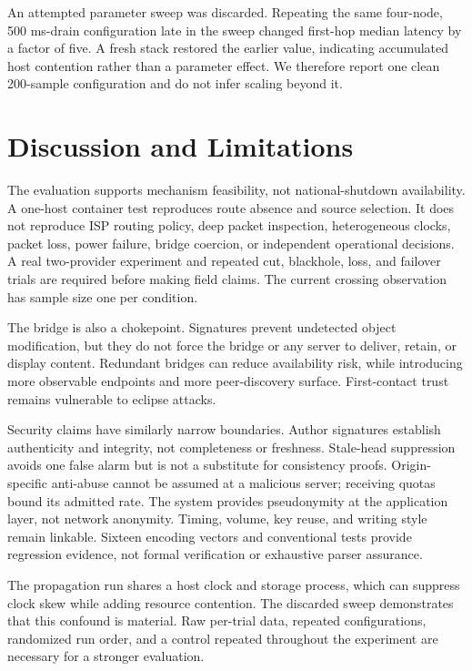 \documentclass[conference,a4paper]{IEEEtran}
\begin{document}
An attempted parameter sweep was discarded. Repeating the same four-node, 500 ms-drain configuration
late in the sweep changed first-hop median latency by a factor of five. A fresh stack restored the
earlier value, indicating accumulated host contention rather than a parameter effect. We therefore
report one clean 200-sample configuration and do not infer scaling beyond it.

\section{Discussion and Limitations}

The evaluation supports mechanism feasibility, not national-shutdown availability. A one-host
container test reproduces route absence and source selection. It does not reproduce ISP routing
policy, deep packet inspection, heterogeneous clocks, packet loss, power failure, bridge coercion,
or independent operational decisions. A real two-provider experiment and repeated cut, blackhole,
loss, and failover trials are required before making field claims. The current crossing observation
has sample size one per condition.

The bridge is also a chokepoint. Signatures prevent undetected object modification, but they do not
force the bridge or any server to deliver, retain, or display content. Redundant bridges can reduce
availability risk, while introducing more observable endpoints and more peer-discovery surface.
First-contact trust remains vulnerable to eclipse attacks.

Security claims have similarly narrow boundaries. Author signatures establish authenticity and
integrity, not completeness or freshness. Stale-head suppression avoids one false alarm but is not a
substitute for consistency proofs. Origin-specific anti-abuse cannot be assumed at a malicious
server; receiving quotas bound its admitted rate. The system provides pseudonymity at the
application layer, not network anonymity. Timing, volume, key reuse, and writing style remain
linkable. Sixteen encoding vectors and conventional tests provide regression evidence, not formal
verification or exhaustive parser assurance.

The propagation run shares a host clock and storage process, which can suppress clock skew while
adding resource contention. The discarded sweep demonstrates that this confound is material. Raw
per-trial data, repeated configurations, randomized run order, and a control repeated throughout the
experiment are necessary for a stronger evaluation.
\end{document}
